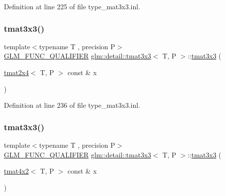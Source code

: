 Definition at line 225 of file type\+\_\+mat3x3.\+inl.

\mbox{\label{structglm_1_1detail_1_1tmat3x3_a98fab3111797488d43d13de3b9c34db9}} 
\subsubsection{\texorpdfstring{tmat3x3()}{tmat3x3()}\hspace{0.1cm}{\footnotesize\ttfamily [15/22]}}
{\footnotesize\ttfamily template$<$typename T , precision P$>$ \\
\hyperlink{setup_8hpp_a33fdea6f91c5f834105f7415e2a64407}{G\+L\+M\+\_\+\+F\+U\+N\+C\+\_\+\+Q\+U\+A\+L\+I\+F\+I\+ER} \hyperlink{structglm_1_1detail_1_1tmat3x3}{glm\+::detail\+::tmat3x3}$<$ T, P $>$\+::\hyperlink{structglm_1_1detail_1_1tmat3x3}{tmat3x3} (\begin{DoxyParamCaption}\item[{\hyperlink{structglm_1_1detail_1_1tmat2x4}{tmat2x4}$<$ T, P $>$ const \&}]{x }\end{DoxyParamCaption})\hspace{0.3cm}{\ttfamily [explicit]}}



Definition at line 236 of file type\+\_\+mat3x3.\+inl.

\mbox{\label{structglm_1_1detail_1_1tmat3x3_a727ffba03de5a02331f41858742f8d09}} 
\subsubsection{\texorpdfstring{tmat3x3()}{tmat3x3()}\hspace{0.1cm}{\footnotesize\ttfamily [16/22]}}
{\footnotesize\ttfamily template$<$typename T , precision P$>$ \\
\hyperlink{setup_8hpp_a33fdea6f91c5f834105f7415e2a64407}{G\+L\+M\+\_\+\+F\+U\+N\+C\+\_\+\+Q\+U\+A\+L\+I\+F\+I\+ER} \hyperlink{structglm_1_1detail_1_1tmat3x3}{glm\+::detail\+::tmat3x3}$<$ T, P $>$\+::\hyperlink{structglm_1_1detail_1_1tmat3x3}{tmat3x3} (\begin{DoxyParamCaption}\item[{\hyperlink{structglm_1_1detail_1_1tmat4x2}{tmat4x2}$<$ T, P $>$ const \&}]{x }\end{DoxyParamCaption})\hspace{0.3cm}{\ttfamily [explicit]}}



